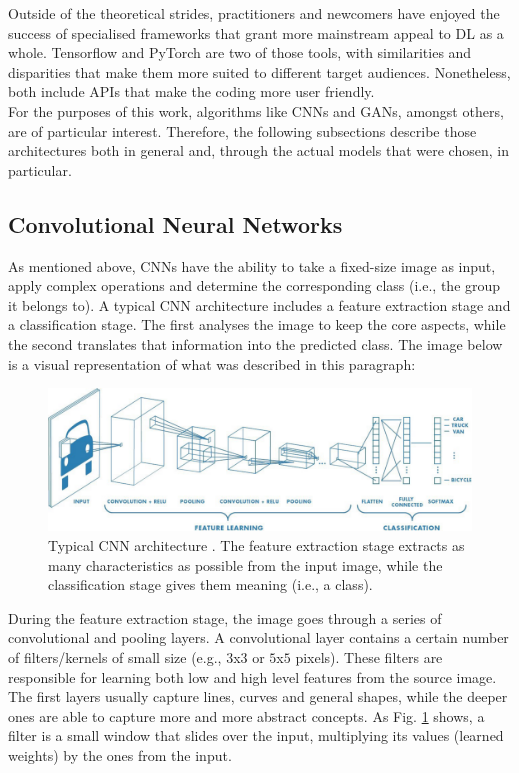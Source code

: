 Outside of the theoretical strides, practitioners and newcomers have enjoyed the success of specialised frameworks that grant more mainstream appeal to \ac{DL} as a whole. Tensorflow \cite{tensorflow} and PyTorch \cite{pytorch} are two of those tools, with similarities and disparities that make them more suited to different target audiences. Nonetheless, both include \ac{API}s that make the coding more user friendly.\\

For the purposes of this work, algorithms like \ac{CNN}s and \ac{GAN}s, amongst others, are of particular interest. Therefore, the following subsections describe those architectures both in general and, through the actual models that were chosen, in particular.

\subsection{Convolutional Neural Networks}
\label{subsec:chap2_cnn}

As mentioned above, \ac{CNN}s have the ability to take a fixed-size image as input, apply complex operations and determine the corresponding class (i.e., the group it belongs to). A typical \ac{CNN} architecture includes a feature extraction stage and a classification stage. The first analyses the image to keep the core aspects, while the second translates that information into the predicted class. The image below is a visual representation of what was described in this paragraph:

\begin{figure}[h]
\centering
\includegraphics[width=380pt]{figures/figure_2.pdf}
\caption{Typical \ac{CNN} architecture \cite{cnn_architecture}. The feature extraction stage extracts as many characteristics as possible from the input image, while the classification stage gives them meaning (i.e., a class).}
\label{fig:cnn}
\end{figure}

During the feature extraction stage, the image goes through a series of convolutional and pooling layers. A convolutional layer contains a certain number of filters/kernels of small size (e.g., $3$x$3$ or $5$x$5$ pixels). These filters are responsible for learning both low and high level features from the source image. The first layers usually capture lines, curves and general shapes, while the deeper ones are able to capture more and more abstract concepts. As Fig. \ref{fig:cnn} shows, a filter is a small window that slides over the input, multiplying its values (learned weights) by the ones from the input.
    
